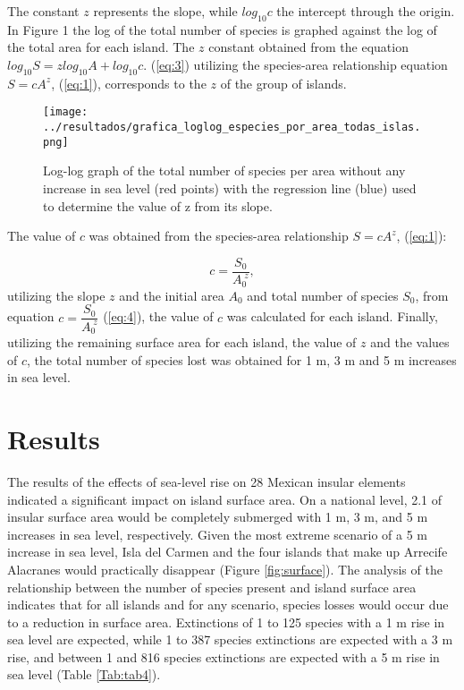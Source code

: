 \documentclass{article} %
\begin{document}
The constant $z$ represents the slope, while $log_{10}c$ the intercept through the origin. In Figure 1 the log of the total number of species is graphed against the log of the total
area for each island. The $z$ constant obtained from the equation $log_{10}S=zlog_{10}A+log_{10}c.$ (\ref{eq:3}) utilizing the species-area relationship equation $S=cA^{z}$, (\ref{eq:1}), corresponds to the $z$ of the group of islands.

\begin{figure}
  \begin{center}
  \texttt{[image: ../resultados/grafica\_loglog\_especies\_por\_area\_todas\_islas.png]}
  \caption{Log-log graph of the total number of species per area without any increase
in sea level (red points) with the regression line (blue) used to determine the value
of z from its slope.}
  \label{fig:loglog}
  \end{center}
\end{figure}

The value of $c$ was obtained from the species-area relationship $S=cA^{z}$, (\ref{eq:1}):


\begin{equation}
\label{eq:4}
c=\dfrac{S_{0}}{A_{0}^{\;z}},
\end{equation}
utilizing the slope $z$ and the initial area $A_{0}$ and total number of species $S_{0}$, from
equation $c=\dfrac{S_{0}}{A_{0}^{\;z}}$ (\ref{eq:4}), the value of $c$ was calculated for each island. Finally, utilizing
the remaining surface area for each island, the value of $z$ and the values of $c$, the
total number of species lost was obtained for 1 m, 3 m and 5 m increases in sea
level.


\section{Results}

The results of the effects of sea-level rise on 28 Mexican insular elements indicated
a significant impact on island surface area. On a national level, 2.1%
of insular surface area would be completely submerged with 1 m, 3 m, and 5 m
increases in sea level, respectively. Given the most extreme scenario of a 5 m
increase in sea level, Isla del Carmen and the four islands that make up Arrecife
Alacranes would practically disappear (Figure \ref{fig:surface}). The analysis of the relationship
between the number of species present and island surface area indicates that for all
islands and for any scenario, species losses would occur due to a reduction in surface
area. Extinctions of 1 to 125 species with a 1 m rise in sea level are expected, while
1 to 387 species extinctions are expected with a 3 m rise, and between 1 and 816
species extinctions are expected with a 5 m rise in sea level (Table \ref{Tab:tab4}).\\
\end{document}
